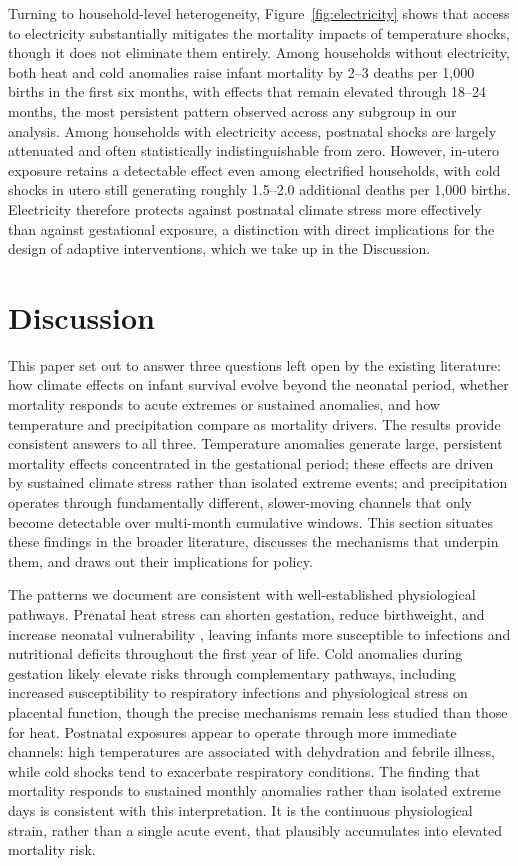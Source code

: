 \documentclass[a4paper]{article}
\begin{document}
Turning to household-level heterogeneity, Figure~\ref{fig:electricity} shows that access to electricity substantially mitigates the mortality impacts of temperature shocks, though it does not eliminate them entirely. Among households without electricity, both heat and cold anomalies raise infant mortality by 2--3 deaths per 1,000 births in the first six months, with effects that remain elevated through 18--24 months, the most persistent pattern observed across any subgroup in our analysis. Among households with electricity access, postnatal shocks are largely attenuated and often statistically indistinguishable from zero. However, in-utero exposure retains a detectable effect even among electrified households, with cold shocks in utero still generating roughly 1.5--2.0 additional deaths per 1,000 births. Electricity therefore protects against postnatal climate stress more effectively than against gestational exposure, a distinction with direct implications for the design of adaptive interventions, which we take up in the Discussion.

\section{Discussion} \label{sec:discussion}

This paper set out to answer three questions left open by the existing literature: how climate effects on infant survival evolve beyond the neonatal period, whether mortality responds to acute extremes or sustained anomalies, and how temperature and precipitation compare as mortality drivers. The results provide consistent answers to all three. Temperature anomalies generate large, persistent mortality effects concentrated in the gestational period; these effects are driven by sustained climate stress rather than isolated extreme events; and precipitation operates through fundamentally different, slower-moving channels that only become detectable over multi-month cumulative windows. This section situates these findings in the broader literature, discusses the mechanisms that underpin them, and draws out their implications for policy.

The patterns we document are consistent with well-established physiological pathways. Prenatal heat stress can shorten gestation, reduce birthweight, and increase neonatal vulnerability \parencite{strand2012,kuehn2017,sun2020}, leaving infants more susceptible to infections and nutritional deficits throughout the first year of life. Cold anomalies during gestation likely elevate risks through complementary pathways, including increased susceptibility to respiratory infections and physiological stress on placental function, though the precise mechanisms remain less studied than those for heat. Postnatal exposures appear to operate through more immediate channels: high temperatures are associated with dehydration and febrile illness, while cold shocks tend to exacerbate respiratory conditions. The finding that mortality responds to sustained monthly anomalies rather than isolated extreme days is consistent with this interpretation. It is the continuous physiological strain, rather than a single acute event, that plausibly accumulates into elevated mortality risk.
\end{document}
